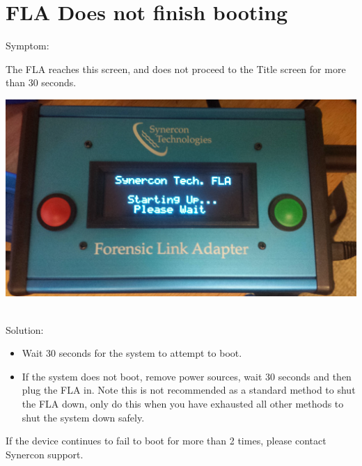 \documentclass[11pt, oneside]{book}
\begin{document}
\section{FLA Does not finish booting}
Symptom:\\
\noindent\begin{minipage}{0.45\textwidth}%
The FLA reaches this screen, and does not proceed to the Title screen for more than 30 seconds.
\end{minipage}%
\hfill%
\begin{minipage}{0.45\textwidth}
\includegraphics[width=\linewidth]{../media/fla_screens/boot_wait}
\end{minipage}\\
Solution:\\
\begin{itemize}
\item Wait 30 seconds for the system to attempt to boot.
\item If the system does not boot, remove power sources, wait 30 seconds and then plug the FLA in. Note this is not recommended as a standard method to shut the FLA down, only do this when you have exhausted all other methods to shut the system down safely.
\end{itemize}
If the device continues to fail to boot for more than 2 times, please contact Synercon support.
\end{document}
